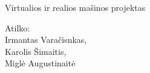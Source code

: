 \documentclass[a4paper,12pt]{article}
\begin{document}
\begin{titlepage}
	\begin{center}
		\Huge Virtualios ir realios mašinos projektas\\
		[4cm]
		\end{center}
		\begin{flushright}
		Atilko:\\
		Irmantas Varačisnkas,\\
		Karolis Šimaitis,\\
		Miglė Augustinaitė\\
		\end{flushright}
\end{titlepage}	
\tableofcontents
\newpage






\end{document}
